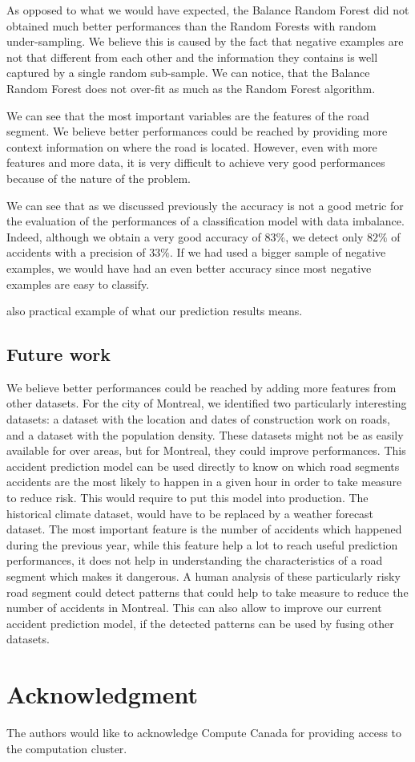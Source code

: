 \documentclass[conference]{IEEEtran}
\begin{document}
As opposed to what we would have expected, the Balance Random Forest did not obtained much better performances than the Random Forests with random under-sampling.
We believe this is caused by the fact that negative examples are not that different from each other and the information they contains is well captured by a single random sub-sample.
We can notice, that the Balance Random Forest does not over-fit as much as the Random Forest algorithm.

We can see that the most important variables are the features of the road segment.
We believe better performances could be reached by providing more context information on where the road is located. However, even with more features and more data, it is very difficult to achieve very good performances because of the nature of the problem.

We can see that as we discussed previously the accuracy is not a good metric for the evaluation of the performances of a classification model with data imbalance. Indeed, although we obtain a very good accuracy of $83\%$, we detect only $82\%$ of accidents with a precision of $33\%$. If we had used a bigger sample of negative examples, we would have had an even better accuracy since most negative examples are easy to classify.

also practical example of what our prediction results means.

\subsection{Future work}
We believe better performances could be reached by adding more features from other datasets.
For the city of Montreal, we identified two particularly interesting datasets: a dataset with the location and dates of construction work on roads, and a dataset with the population density.
These datasets might not be as easily available for over areas, but for Montreal, they could improve performances.
This accident prediction model can be used directly to know on which road segments accidents are the most likely to happen in a given hour in order to take measure to reduce risk.
This would require to put this model into production.
The historical climate dataset, would have to be replaced by a weather forecast dataset.
The most important feature is the number of accidents which happened during the previous year, while this feature help a lot to reach useful prediction performances, it does not help in understanding the characteristics of a road segment which makes it dangerous.
A human analysis of these particularly risky road segment could detect patterns that could help to take measure to reduce the number of accidents in Montreal.
This can also allow to improve our current accident prediction model, if the detected patterns can be used by fusing other datasets.

\section*{Acknowledgment}

The authors would like to acknowledge Compute Canada for providing access to the computation cluster.



\end{document}
